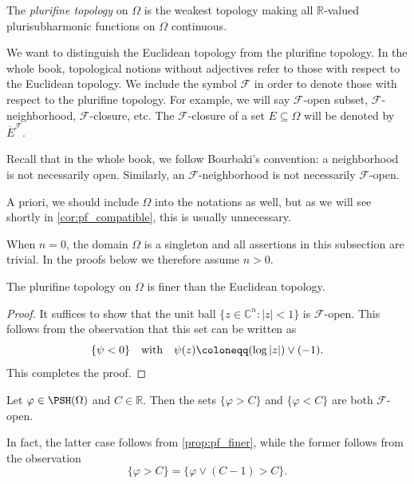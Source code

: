 \begin{definition}\label{def:pftopologydomain}
  The \emph{plurifine topology} on $\Omega$ is the weakest topology making all $\mathbb{R}$-valued plurisubharmonic functions on $\Omega$ continuous.
\end{definition}
We want to distinguish the Euclidean topology from the plurifine topology.
In the whole book, topological notions without adjectives refer to those with respect to the Euclidean topology. We include the symbol $\mathcal{F}$ in order to denote those with respect to the plurifine topology. For example, we will say $\mathcal{F}$-open subset, $\mathcal{F}$-neighborhood, $\mathcal{F}$-closure, etc.
The $\mathcal{F}$-closure of a set $E\subseteq \Omega$ will be denoted by $\overline{E}^{\mathcal{F}}$.

Recall that in the whole book, we follow Bourbaki's convention: a neighborhood is not necessarily open. Similarly, an $\mathcal{F}$-neighborhood is not necessarily $\mathcal{F}$-open.

A priori, we should include $\Omega$ into the notations as well, but as we will see shortly in \cref{cor:pf_compatible}, this is usually unnecessary.

When $n=0$, the domain $\Omega$ is a singleton and all assertions in this subsection are trivial. In the proofs below we therefore assume $n>0$.


\begin{proposition}\label{prop:pf_finer}
  The plurifine topology on $\Omega$ is finer than the Euclidean topology.
\end{proposition}
\begin{proof}
  It suffices to show that the unit ball $\{z\in \mathbb{C}^n:|z|<1\}$ is $\mathcal{F}$-open. This follows from the observation that this set can be written as
  \[
      \{\psi<0\} \quad\textup{with}\quad \psi(z)\coloneqq (\log |z|) \lor (-1).
  \]
  This completes the proof.
\end{proof}

\begin{example}\label{ex:pfopenpsh}
    Let $\varphi\in \PSH(\Omega)$ and $C\in \mathbb{R}$. Then the sets $\{\varphi>C\}$ and $\{\varphi<C\}$ are both $\mathcal{F}$-open.

    In fact, the latter case follows from \cref{prop:pf_finer}, while the former follows from the observation
    \[
    \{\varphi>C\}=\{\varphi\lor (C-1)>C\}.
    \]
\end{example}

